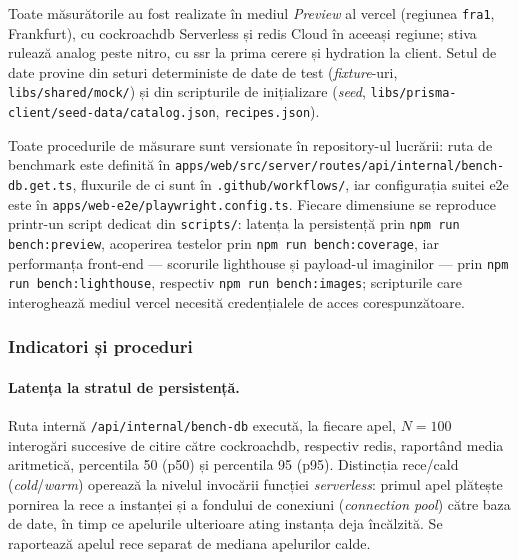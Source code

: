 Toate măsurătorile au fost realizate în mediul \textit{Preview} al \gls{vercel} (regiunea \texttt{fra1}, Frankfurt), cu \gls{cockroachdb} Serverless și \gls{redis} Cloud în aceeași regiune; stiva rulează \gls{analog} peste \gls{nitro}, cu \acrshort{ssr} la prima cerere și \gls{hydration} la client. Setul de date provine din seturi deterministe de date de test (\textit{fixture}-uri, \texttt{libs/shared/mock/}) și din scripturile de inițializare (\textit{seed}, \texttt{libs/\allowbreak prisma-client/\allowbreak seed-data/\allowbreak catalog.json}, \texttt{recipes.json}).

Toate procedurile de măsurare sunt versionate în repository-ul lucrării: ruta de benchmark este definită în \texttt{apps/\allowbreak web/\allowbreak src/\allowbreak server/\allowbreak routes/\allowbreak api/\allowbreak internal/\allowbreak bench-db.get.ts}, fluxurile de \acrshort{ci} sunt în \texttt{.github/workflows/}, iar configurația suitei \acrshort{e2e} este în \texttt{apps/web-e2e/playwright.config.ts}. Fiecare dimensiune se reproduce printr-un script dedicat din \texttt{scripts/}: latența la persistență prin \texttt{npm run bench:preview}, acoperirea testelor prin \texttt{npm run bench:coverage}, iar performanța front-end --- scorurile \gls{lighthouse} și payload-ul imaginilor --- prin \texttt{npm run bench:lighthouse}, respectiv \texttt{npm run bench:images}; scripturile care interoghează mediul \gls{vercel} necesită credențialele de acces corespunzătoare.

\subsubsection{Indicatori și proceduri}\label{subsec:indicatori-proceduri}

\paragraph{Latența la stratul de persistență.} Ruta internă \texttt{/api/internal/bench-db} execută, la fiecare apel, \(N=100\) interogări succesive de citire către \gls{cockroachdb}, respectiv \gls{redis}, raportând media aritmetică, percentila 50 (\acrshort{p50}) și percentila 95 (\acrshort{p95}). Distincția rece/cald (\textit{cold}/\textit{warm}) operează la nivelul invocării funcției \textit{serverless}: primul apel plătește pornirea la rece a instanței și a fondului de conexiuni (\textit{connection pool}) către baza de date, în timp ce apelurile ulterioare ating instanța deja încălzită. Se raportează apelul rece separat de mediana apelurilor calde.

